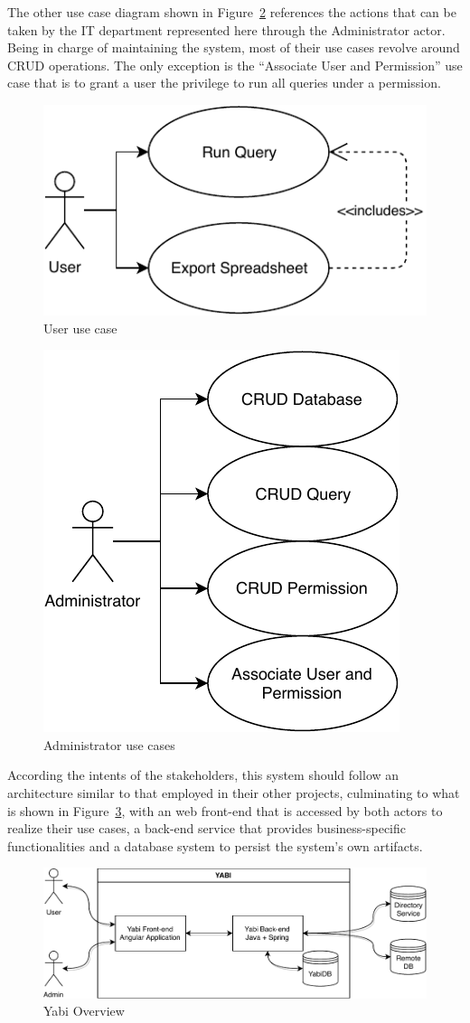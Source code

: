 The other use case diagram shown in Figure~\ref{fig:adminusecases} references the actions that can be taken by the \gls{IT} department represented here through the Administrator actor. Being in charge of maintaining the system, most of their use cases revolve around \gls{CRUD} operations. The only exception is the ``Associate User and Permission'' use case that is to grant a user the privilege to run all queries under a permission.

\begin{figure}
  \centering
  \includegraphics[width=.5\textwidth]{images/diagramas/userusecase}
  \caption{User use case}\label{fig:userusecase}
\end{figure}

\begin{figure}
  \centering
  \includegraphics[width=.5\textwidth]{images/diagramas/adminusecase}
  \caption{Administrator use cases}\label{fig:adminusecases}
\end{figure}

According the intents of the stakeholders, this system should follow an architecture similar to that employed in their other projects, culminating to what is shown in Figure~\ref{fig:overview}, with an web front-end that is accessed by both actors to realize their use cases, a back-end service that provides business-specific functionalities and a database system to persist the system's own artifacts.

\begin{figure}
  \centering
  \includegraphics[width=\textwidth]{images/diagramas/overview.pdf}
  \caption{Yabi Overview}\label{fig:overview}
\end{figure}


